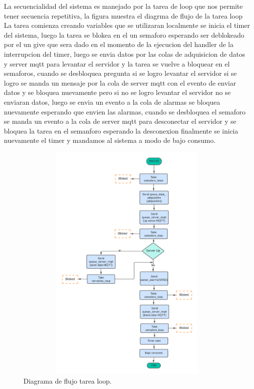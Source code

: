 La secuencialidad del sistema es manejado por la tarea de loop que nos permite tener secuencia repetitiva, la figura muestra el diagrma de flujo de la tarea loop 
La tarea comienza creando variables que se utilizaran localmente se inicia el timer del sistema, luego la tarea se blokea en el un semaforo esperando ser deblokeado por el un give que sera dado en el momento de la ejecucion del handler de la interrupcion del timer, luego se envia datos por las colas de adquisicion de datos y server mqtt para levantar el servidor y la tarea se vuelve a bloquear en el semaforos, cuando se desbloquea pregunta si se logro levantar el servidor si se logro se manda un mensaje por la cola de server mqtt con el evento de enviar datos y se bloquea nuevamente pero si no se logro levantar el servidor no se enviaran datos, luego se envia un evento a la cola de alarmas se bloquea nuevamente esperando que envien las alarmas, cuando se desbloquea el semaforo se manda un evento a la cola de server mqtt para desconectar el servidor y se bloquea la tarea en el semanforo esperando la desconexion  finalmente se inicia nuevamente el timer y mandamos al sistema a modo de bajo consumo. 
\begin{figure}[h]
  \centering
	\includegraphics[width=12cm, height=12cm]{./Figures/DF task loop.png}
	\caption{Diagrama de flujo tarea loop.}
	\label{fig:Df tarea loop sistema}
\end{figure}

